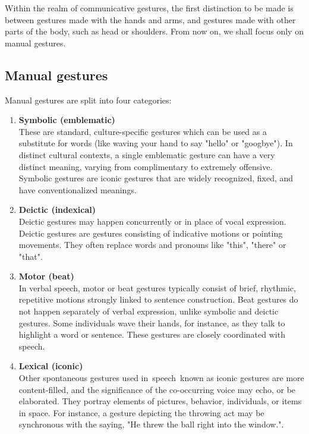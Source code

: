 \documentclass[12pt,a4paper,twoside]{report}
\begin{document}
Within the realm of communicative gestures, the first distinction to be made is between gestures made with the hands and arms, and gestures made with other parts of the body, such as head or shoulders. From now on, we shall focus only on manual gestures.

\subsection{Manual gestures}
Manual gestures are split into four categories:

\begin{enumerate}
  \item \textbf{Symbolic (emblematic)} \\
    These are standard, culture-specific gestures which can be used as a substitute for words (like waving your hand to say "hello" or "googbye"). In distinct cultural contexts, a single emblematic gesture can have a very distinct meaning, varying from complimentary to extremely offensive.  Symbolic gestures are iconic gestures that are widely recognized, fixed, and have conventionalized meanings. \cite{Krauss}

  \item \textbf{Deictic (indexical)} \\
    Deictic gestures may happen concurrently or in place of vocal expression. Deictic gestures are gestures consisting of indicative motions or pointing movements. They often replace words and pronouns like "this", "there" or "that".

  \item \textbf{Motor (beat)} \\
    In verbal speech, motor or beat gestures typically consist of brief, rhythmic, repetitive motions strongly linked to sentence construction. Beat gestures do not happen separately of verbal expression, unlike symbolic and deictic gestures. Some individuals wave their hands, for instance, as they talk to highlight a word or sentence. These gestures are closely coordinated with speech.

  \item \textbf{Lexical (iconic)} \\
    Other spontaneous gestures used in speech known as iconic gestures are more content-filled, and the significance of the co-occurring voice may echo, or be elaborated. They portray elements of pictures, behavior, individuals, or items in space. For instance, a gesture depicting the throwing act may be synchronous with the saying, "He threw the ball right into the window.".
\end{enumerate}
\end{document}
